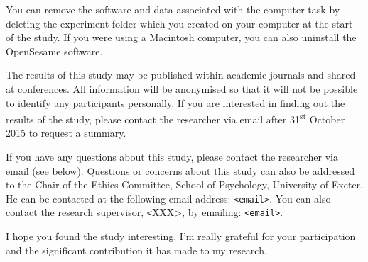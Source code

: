 You can remove the software and data associated with the computer task
by deleting the experiment folder which you created on your computer at
the start of the study. If you were using a Macintosh computer, you can
also uninstall the OpenSesame software.

The results of this study may be published within academic journals
and shared at conferences. All information will be anonymised so that
it will not be possible to identify any participants personally. If you
are interested in finding out the results of the study, please contact
the researcher via email after 31\textsuperscript{st} October 2015 to
request a summary.

If you have any questions about this study, please contact the researcher
via email (see below). Questions or concerns about this study can also be
addressed to the Chair of the Ethics Committee, School of Psychology,
University of Exeter. He can be contacted at the following email
address: \texttt{<email>}. You can also contact the research supervisor,
\texttt<XXX>, by emailing: \texttt{<email>}.

I hope you found the study interesting. I'm really grateful for your
participation and the significant contribution it has made to my research.
